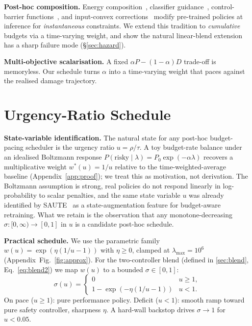 \documentclass{article}
\begin{document}
\textbf{Post-hoc composition.}
Energy composition~\citep{urain2023composable, gladstone2025ebt}, classifier guidance~\citep{zhang2025constrained}, control-barrier functions~\citep{xiao2023safediffuser}, and input-convex corrections~\citep{durkin2025picnn} modify pre-trained policies at inference for \emph{instantaneous} constraints.
We extend this tradition to \emph{cumulative} budgets via a time-varying weight, and show the natural linear-blend extension has a sharp failure mode (\S\ref{sec:hazard}).

\textbf{Multi-objective scalarisation.}
A fixed $\alpha P - (1-\alpha)D$ trade-off is memoryless.
Our schedule turns $\alpha$ into a time-varying weight that paces against the realised damage trajectory.

\section{Urgency-Ratio Schedule}
\label{sec:theory}

\textbf{State-variable identification.}
The natural state for any post-hoc budget-pacing scheduler is the urgency ratio $u=\rho/\tau$.
A toy budget-rate balance under an idealised Boltzmann response $P(\mathrm{risky}\mid\lambda)=P_0\exp(-\alpha\lambda)$ recovers a multiplicative weight $w^*(u) = 1/u$ relative to the time-weighted-average baseline (Appendix~\ref{app:proof}); we treat this as motivation, not derivation.
The Boltzmann assumption is strong, real policies do not respond linearly in log-probability to scalar penalties, and the same state variable $u$ was already identified by SAUTE~\citep{sootla2022saute} as a state-augmentation feature for budget-aware retraining.
What we retain is the observation that any monotone-decreasing $\sigma:[0,\infty)\!\to\![0,1]$ in $u$ is a candidate post-hoc schedule.

\textbf{Practical schedule.}
We use the parametric family
$w(u)=\exp(\eta(1/u-1))$ with $\eta\!\ge\!0$, clamped at $\lambda_{\max}\!=\!10^6$ (Appendix~Fig.~\ref{fig:approx}).
For the two-controller blend (defined in \cref{sec:blend}, Eq.~\ref{eq:blend2}) we map $w(u)$ to a bounded $\sigma\in[0,1]$:
\begin{equation}
    \sigma(u) = \begin{cases}
        0 & u \ge 1, \\
        1 - \exp(-\eta(1/u - 1)) & u < 1.
    \end{cases}
\label{eq:sigma}
\end{equation}
On pace ($u\!\ge\!1$): pure performance policy. Deficit ($u\!<\!1$): smooth ramp toward pure safety controller, sharpness $\eta$.
A hard-wall backstop drives $\sigma\!\to\!1$ for $u\!<\!0.05$.
\end{document}
